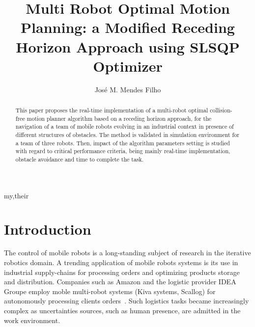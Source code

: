 \documentclass[eprint]{actapoly}
\begin{document}
\title[Trajectory Generation Approach]
{Multi Robot Optimal Motion Planning: a Modified Receding Horizon Approach using SLSQP Optimizer}

\author[J. M. Mendes Filho]{Jos\'{e} M. Mendes Filho}{my,their}


\begin{abstract}

 This paper proposes the real-time implementation of a multi-robot optimal collision-free motion planner
 algorithm based on a receding horizon approach, for the navigation of a team of mobile
 robots evolving in an industrial context in presence of different structures of obstacles.
 The method is validated in simulation environment for a team of three robots. Then, impact of the algorithm
 parameters setting is studied with regard to critical performance criteria, being mainly real-time implementation,
 obstacle avoidance and time to complete the task.
 
\end{abstract}


\maketitle




\section{Introduction}\label{sec:intro}





The %
control of mobile robots is a long-standing subject of research 
in the iterative robotics domain. A trending application of mobile robots systems
is its use in industrial supply-chains for processing orders and optimizing products storage and distribution. Companies such as Amazon and the logistic provider IDEA Groupe employ moble multi-robot systems (Kiva systems, Scallog) for autonomously processing clients orders~\cite{Gizmag,supplychain}.
Such logistics tasks became increasingly complex as uncertainties sources, such as human presence, are admitted in the work environment.
\end{document}
